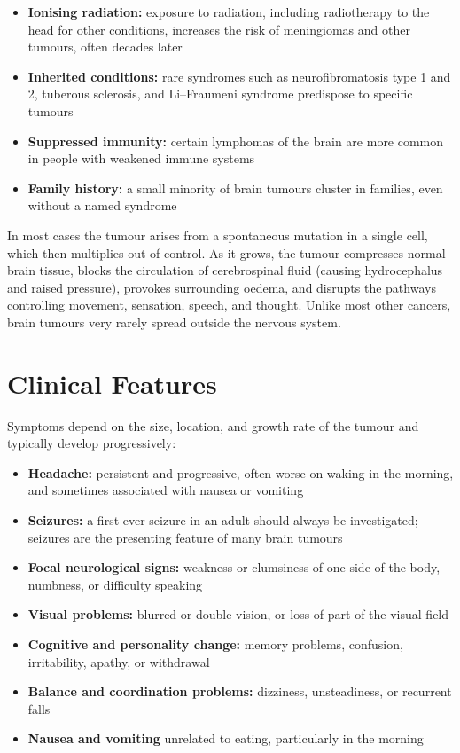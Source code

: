 \begin{itemize}
    \item \textbf{Ionising radiation:} exposure to radiation, including radiotherapy to the head for other conditions, increases the risk of meningiomas and other tumours, often decades later
    \item \textbf{Inherited conditions:} rare syndromes such as neurofibromatosis type 1 and 2, tuberous sclerosis, and Li--Fraumeni syndrome predispose to specific tumours
    \item \textbf{Suppressed immunity:} certain lymphomas of the brain are more common in people with weakened immune systems
    \item \textbf{Family history:} a small minority of brain tumours cluster in families, even without a named syndrome
\end{itemize}

In most cases the tumour arises from a spontaneous mutation in a single cell, which then multiplies out of control. As it grows, the tumour compresses normal brain tissue, blocks the circulation of cerebrospinal fluid (causing hydrocephalus and raised pressure), provokes surrounding oedema, and disrupts the pathways controlling movement, sensation, speech, and thought. Unlike most other cancers, brain tumours very rarely spread outside the nervous system.

\section*{Clinical Features}
Symptoms depend on the size, location, and growth rate of the tumour and typically develop progressively:

\begin{itemize}
    \item \textbf{Headache:} persistent and progressive, often worse on waking in the morning, and sometimes associated with nausea or vomiting
    \item \textbf{Seizures:} a first-ever seizure in an adult should always be investigated; seizures are the presenting feature of many brain tumours
    \item \textbf{Focal neurological signs:} weakness or clumsiness of one side of the body, numbness, or difficulty speaking
    \item \textbf{Visual problems:} blurred or double vision, or loss of part of the visual field
    \item \textbf{Cognitive and personality change:} memory problems, confusion, irritability, apathy, or withdrawal
    \item \textbf{Balance and coordination problems:} dizziness, unsteadiness, or recurrent falls
    \item \textbf{Nausea and vomiting} unrelated to eating, particularly in the morning
\end{itemize}

